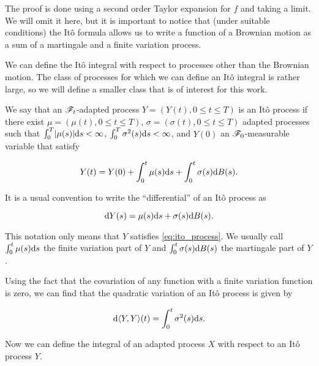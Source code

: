 The proof is done using a second order Taylor expansion for $f$ and taking a limit. We will omit it here, but it is important to notice that (under suitable conditions) the Itô formula allows us to write a function of a Brownian motion as a sum of a martingale and a finite variation process.

We can define the Itô integral with respect to processes other than the Brownian motion. The class of processes for which we can define an Itô integral is rather large, so we will define a smaller class that is of interest for this work.

\begin{definition}
    We say that an $\mathscr F_t$-adapted process $Y = (Y(t), 0 \le t \le T)$ is an Itô process if there exist $\mu = (\mu(t), 0 \le t \le T)$, $\sigma = (\sigma(t), 0 \le t \le T)$ adapted processes such that $\int_0^T \lvert \mu(s) \rvert\mathrm d s < \infty$, $\int_0^T \sigma^2(s) \mathrm d s < \infty$, and $Y(0)$ an $\mathscr F_0$-measurable variable that satisfy 

    \begin{equation} \label{eq:ito_process}
        Y(t) = Y(0) + \int_0^t \mu(s) \mathrm d s + \int_0^t \sigma(s) \mathrm d B(s).
    \end{equation}
\end{definition}

It is a usual convention to write the ``differential'' of an Itô process as

 \begin{equation*}
    \mathrm d Y(s) = \mu(s) \mathrm d s + \sigma(s) \mathrm d B(s).
 \end{equation*}

 This notation only means that $Y$ satisfies \eqref{eq:ito_process}. We usually call $\int_0^t \mu(s) \mathrm d s$ the finite variation part of $Y$ and $\int_0^t \sigma(s) \mathrm d B(s)$ the martingale part of $Y$. 

 Using the fact that the covariation of any function with a finite variation function is zero, we can find that the quadratic variation of an Itô process is given by

 \begin{equation*}
    \mathrm d \langle Y, Y \rangle(t) = \int_0^t \sigma^2 (s) \mathrm d s.
 \end{equation*}

 Now we can define the integral of an adapted process $X$ with respect to an Itô process $Y$. 

